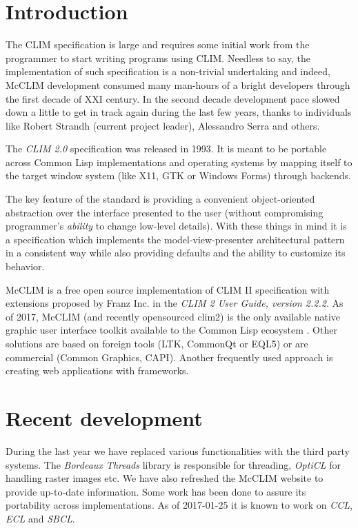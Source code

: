 \documentclass{sig-alternate-05-2015}
\begin{document}
\section{Introduction}

The CLIM specification is large and requires some initial work from
the programmer to start writing programs using CLIM. Needless to say,
the implementation of such specification is a non-trivial undertaking
and indeed, McCLIM development consumed many man-hours of a bright
developers through the first decade of XXI century. In the second
decade development pace slowed down a little to get in track again
during the last few years, thanks to individuals like Robert Strandh
(current project leader), Alessandro Serra and others.

The \emph{CLIM 2.0} specification was released in 1993. It is meant to
be portable across Common Lisp\cite{ansi:common:lisp} implementations
and operating systems by mapping itself to the target window system
(like X11\cite{X11}, GTK\cite{GTK} or Windows
Forms\cite{WindowsForms}) through backends.

The key feature of the standard is providing a convenient
object-oriented abstraction over the interface presented to the user
(without compromising programmer's \emph{ability} to change low-level
details). With these things in mind it is a specification which
implements the model-view-presenter architectural pattern in a
consistent way while also providing defaults and the ability to
customize its behavior.

McCLIM is a free open source implementation of CLIM II specification
with extensions proposed by Franz Inc. in the \emph{CLIM 2 User Guide,
  version 2.2.2}. As of 2017, McCLIM (and recently opensourced
clim2\cite{clim2-franz}) is the only available native graphic user
interface toolkit available to the Common Lisp ecosystem . Other
solutions are based on foreign tools (LTK\cite{LTK},
CommonQt\cite{CommonQt} or EQL5\cite{EQL5}) or are commercial (Common
Graphics\cite{CG}, CAPI\cite{CAPI}). Another frequently used approach
is creating web applications with frameworks.

\section{Recent development}

During the last year we have replaced various functionalities with the
third party systems. The \emph{Bordeaux Threads}\cite{BT} library is
responsible for threading, \emph{OptiCL}\cite{OptiCL} for handling
raster images etc. We have also refreshed the McCLIM website to
provide up-to-date information. Some work has been done to assure its
portability across implementations. As of 2017-01-25 it is known to
work on \emph{CCL}\cite{CCL}, \emph{ECL}\cite{ECL} and
\emph{SBCL}\cite{SBCL}.
\end{document}
